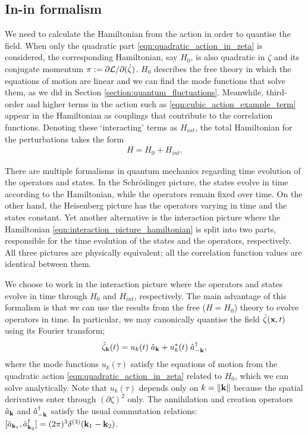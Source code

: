 \subsection{In-in formalism} \label{section:in_in_formalism}

We need to calculate the Hamiltonian from the action in order to quantise the field. When only the quadratic part \eqref{eqn:quadratic_action_in_zeta} is considered, the corresponding Hamiltonian, say $H_0$, is also quadratic in $\zeta$ and its conjugate momentum $\pi := \partial\mathcal{L}/\partial(\dot{\zeta})$. $H_0$ describes the free theory in which the equations of motion are linear and we can find the mode functions that solve them, as we did in Section \ref{section:quantum_fluctuations}. Meanwhile, third-order and higher terms in the action such as \eqref{eqn:cubic_action_example_term} appear in the Hamiltonian as couplings that contribute to the correlation functions. Denoting these `interacting' terms as $H_{int}$, the total Hamiltonian for the perturbations takes the form
\begin{align}
	H = H_0 + H_{int}. \label{eqn:interaction_picture_hamiltonian}
\end{align}

There are multiple formalisms in quantum mechanics regarding time evolution of the operators and states. In the Schr\"odinger picture, the states evolve in time according to the Hamiltonian, while the operators remain fixed over time. On the other hand, the Heisenberg picture has the operators varying in time and the states constant. Yet another alternative is the interaction picture where the Hamiltonian \eqref{eqn:interaction_picture_hamiltonian} is split into two parts, responsible for the time evolution of the states and the operators, respectively. All three pictures are physically equivalent; all the correlation function values are identical between them.

We choose to work in the interaction picture where the operators and states evolve in time through $H_0$ and $H_{int}$, respectively. The main advantage of this formalism is that we can use the results from the free ($H=H_0$) theory to evolve operators in time. In particular, we may canonically quantise the field $\hat{\zeta}(\mathbf{x},t)$ using its Fourier transform;
\begin{align}
	\hat{\zeta}_\mathbf{k} (t) = u_k(t) \; \hat{a}_\mathbf{k} + u_k^*(t) \; \hat{a}_{-\mathbf{k}}^\dagger, \label{eqn:zeta_canonical_quantisation}
\end{align} 
where the mode functions $u_k(\tau)$ satisfy the equations of motion from the quadratic action \eqref{eqn:quadratic_action_in_zeta} related to $H_0$, which we can solve analytically. Note that $u_k(\tau)$ depends only on $k=\|\mathbf{k}\|$ because the spatial derivatives enter through $(\partial\zeta)^2$ only. The annihilation and creation operators $\hat{a}_\mathbf{k}$ and $\hat{a}_{-\mathbf{k}}^\dagger$ satisfy the usual commutation relations: $[\hat{a}_{\mathbf{k}_1},\hat{a}_{\mathbf{k}_2}^\dagger] = (2\pi)^3 \delta^{(3)}(\mathbf{k}_1-\mathbf{k}_2)$.

